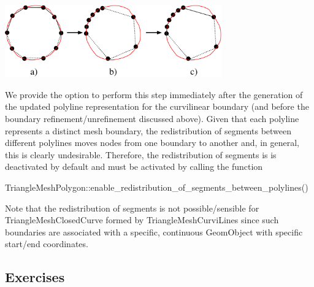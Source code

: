 
\begin{DoxyImage}
\includegraphics[width=0.7\textwidth]{redistribution}
\end{DoxyImage}


We provide the option to perform this step immediately after the generation of the updated polyline representation for the curvilinear boundary (and before the boundary refinement/unrefinement discussed above). Given that each polyline represents a distinct mesh boundary, the redistribution of segments between different polylines moves nodes from one boundary to another and, in general, this is clearly undesirable. Therefore, the redistribution of segments is is deactivated by default and must be activated by calling the function


\begin{DoxyCode}
TriangleMeshPolygon::enable\_redistribution\_of\_segments\_between\_polylines()
\end{DoxyCode}


Note that the redistribution of segments is not possible/sensible for {\ttfamily Triangle\+Mesh\+Closed\+Curve} formed by {\ttfamily Triangle\+Mesh\+Curvi\+Lines} since such boundaries are associated with a specific, continuous {\ttfamily Geom\+Object} with specific start/end coordinates.



\hypertarget{index_exercises}{}\subsection{Exercises}\label{index_exercises}

